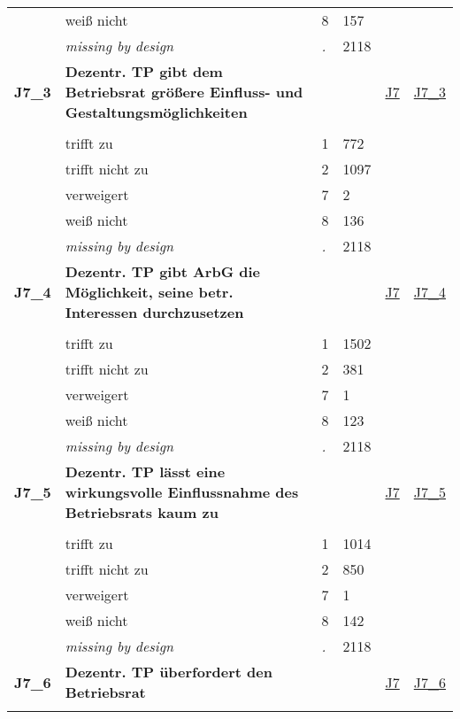 \begin{longtable}{| L{2.45cm} | L{6cm} | C{1.5cm} | R{1cm} | C{2.25cm} | C{2.25cm} |}
   & weiß nicht & 8 & 157 &  &  \\ 
   & \textit{missing by design} & \textit{.} & 2118 &  &  \\ 
   \midrule
\textbf{J7\_3}\label{var:J7:3} & \textbf{Dezentr. TP gibt dem Betriebsrat größere Einfluss- und Gestaltungsmöglichkeiten} &  &  & \hyperref[J7]{J7} & \hyperref[var:suf:J7:3]{J7\_3} \\ 
   &  &  &  &  &  \\ 
   & trifft zu & 1 & 772 &  &  \\ 
   & trifft nicht zu & 2 & 1097 &  &  \\ 
   & verweigert & 7 & 2 &  &  \\ 
   & weiß nicht & 8 & 136 &  &  \\ 
   & \textit{missing by design} & \textit{.} & 2118 &  &  \\ 
   \midrule
\textbf{J7\_4}\label{var:J7:4} & \textbf{Dezentr. TP gibt ArbG die Möglichkeit, seine betr. Interessen durchzusetzen} &  &  & \hyperref[J7]{J7} & \hyperref[var:suf:J7:4]{J7\_4} \\ 
   &  &  &  &  &  \\ 
   & trifft zu & 1 & 1502 &  &  \\ 
   & trifft nicht zu & 2 & 381 &  &  \\ 
   & verweigert & 7 & 1 &  &  \\ 
   & weiß nicht & 8 & 123 &  &  \\ 
   & \textit{missing by design} & \textit{.} & 2118 &  &  \\ 
   \midrule
\textbf{J7\_5}\label{var:J7:5} & \textbf{Dezentr. TP lässt eine wirkungsvolle Einflussnahme des Betriebsrats kaum zu} &  &  & \hyperref[J7]{J7} & \hyperref[var:suf:J7:5]{J7\_5} \\ 
   &  &  &  &  &  \\ 
   & trifft zu & 1 & 1014 &  &  \\ 
   & trifft nicht zu & 2 & 850 &  &  \\ 
   & verweigert & 7 & 1 &  &  \\ 
   & weiß nicht & 8 & 142 &  &  \\ 
   & \textit{missing by design} & \textit{.} & 2118 &  &  \\ 
   \midrule
\textbf{J7\_6}\label{var:J7:6} & \textbf{Dezentr. TP überfordert den Betriebsrat} &  &  & \hyperref[J7]{J7} & \hyperref[var:suf:J7:6]{J7\_6} \\ 
   &  &  &  &  &  \\ 

\end{longtable}
